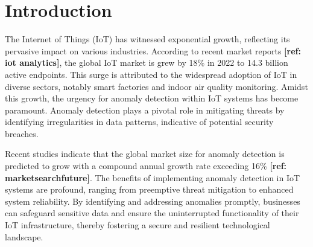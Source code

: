 \documentclass[final,3p,times,twocolumn]{elsarticle}
\begin{document}

\section{Introduction}\label{sec1}
The Internet of Things (IoT) has witnessed exponential growth, reflecting its pervasive impact on various industries. According to recent market reports \textbf{[ref: iot analytics]}, the global IoT market is grew by 18\% in 2022 to 14.3 billion active endpoints. This surge is attributed to the widespread adoption of IoT in diverse sectors, notably smart factories and indoor air quality monitoring. Amidst this growth, the urgency for anomaly detection within IoT systems has become paramount. Anomaly detection plays a pivotal role in mitigating threats by identifying irregularities in data patterns, indicative of potential security breaches. 

Recent studies indicate that the global market size for anomaly detection is predicted to grow with a compound annual growth rate exceeding 16\% \textbf{[ref: marketsearchfuture]}. The benefits of implementing anomaly detection in IoT systems are profound, ranging from preemptive threat mitigation to enhanced system reliability. By identifying and addressing anomalies promptly, businesses can safeguard sensitive data and ensure the uninterrupted functionality of their IoT infrastructure, thereby fostering a secure and resilient technological landscape.
\end{document}
